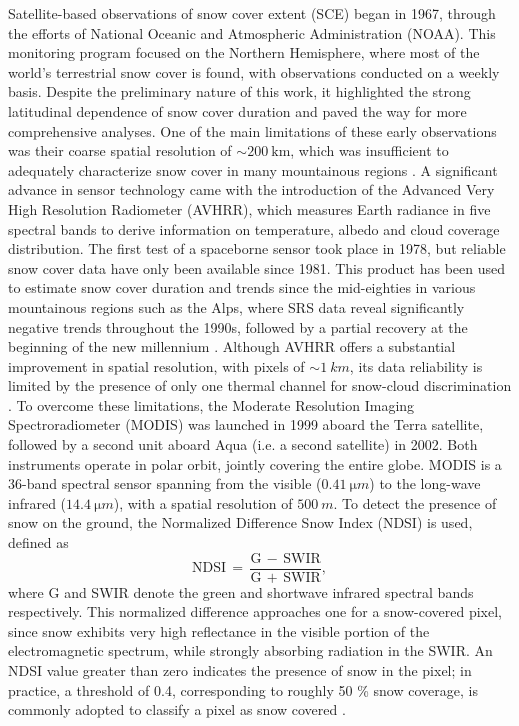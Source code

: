 Satellite-based observations of snow cover extent (SCE) began in 1967, through the efforts of National Oceanic and Atmospheric Administration (NOAA). 
This monitoring program focused on the Northern Hemisphere, where most of the world's terrestrial snow cover is found, with observations conducted 
on a weekly basis. Despite the preliminary nature of this work, it highlighted the strong latitudinal dependence of snow cover duration and paved 
the way for more comprehensive analyses. One of the main limitations of these early observations was their coarse spatial resolution of 
$\sim \SI{200}{\km}$, which was insufficient to adequately characterize snow cover in many mountainous regions \parencite{NOAA_first_SRS}. 
A significant advance in sensor technology came with the introduction of the Advanced Very High Resolution Radiometer (AVHRR), which measures Earth 
radiance in five spectral bands to derive information on temperature, albedo and cloud coverage distribution. The first test of a spaceborne sensor 
took place in 1978, but reliable snow cover data have only been available since 1981. This product has been used to estimate snow cover duration 
and trends since the mid-eighties in various mountainous regions such as the Alps, where SRS data reveal significantly negative trends throughout 
the 1990s, followed by a partial recovery at the beginning of the new millennium \parencite{AVHRR_example}. Although AVHRR offers a substantial  
improvement in spatial resolution, with pixels of $\sim \SI{1}{km}$, its data reliability is limited by the presence of only one thermal channel 
for snow-cloud discrimination \parencite{MODIS_GAR}.
To overcome these limitations, the Moderate Resolution Imaging Spectroradiometer (MODIS) was launched in 1999 aboard the Terra satellite, followed by 
a second unit aboard Aqua (i.e. a second satellite) in 2002. Both instruments operate in polar orbit, jointly covering the entire globe. MODIS is a 
36-band spectral sensor spanning from the visible ($\SI{0.41}{\micro m}$) to the long-wave infrared ($\SI{14.4}{\micro m}$), with a spatial resolution 
of $\SI{500}{m}$. To detect the presence of snow on the ground, the Normalized Difference Snow Index (NDSI) is used, defined as
\begin{equation}
    \mathrm{NDSI}\,=\,\frac{\mathrm{G}\,-\,\mathrm{SWIR}}{\mathrm{G}\,+\,\mathrm{SWIR}},
    \label{eq:NDSI}
\end{equation}
where G and SWIR denote the green and shortwave infrared spectral bands respectively. This normalized difference approaches one for a snow-covered 
pixel, since snow exhibits very high reflectance in the visible portion of the electromagnetic spectrum, while strongly absorbing radiation in the 
SWIR. An NDSI value greater than zero indicates the presence of snow in the pixel; in practice, a threshold of 0.4, corresponding to roughly 50 \% 
snow coverage, is commonly adopted to classify a pixel as snow covered \parencite{NDSI_threshold}.


